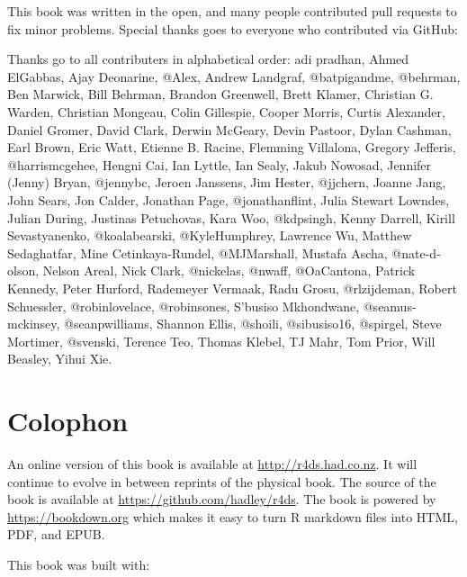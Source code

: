\documentclass[]{book}
\begin{document}
This book was written in the open, and many people contributed pull
requests to fix minor problems. Special thanks goes to everyone who
contributed via GitHub:

Thanks go to all contributers in alphabetical order: adi pradhan, Ahmed
ElGabbas, Ajay Deonarine, @Alex, Andrew Landgraf, @batpigandme,
@behrman, Ben Marwick, Bill Behrman, Brandon Greenwell, Brett Klamer,
Christian G. Warden, Christian Mongeau, Colin Gillespie, Cooper Morris,
Curtis Alexander, Daniel Gromer, David Clark, Derwin McGeary, Devin
Pastoor, Dylan Cashman, Earl Brown, Eric Watt, Etienne B. Racine,
Flemming Villalona, Gregory Jefferis, @harrismcgehee, Hengni Cai, Ian
Lyttle, Ian Sealy, Jakub Nowosad, Jennifer (Jenny) Bryan, @jennybc,
Jeroen Janssens, Jim Hester, @jjchern, Joanne Jang, John Sears, Jon
Calder, Jonathan Page, @jonathanflint, Julia Stewart Lowndes, Julian
During, Justinas Petuchovas, Kara Woo, @kdpsingh, Kenny Darrell, Kirill
Sevastyanenko, @koalabearski, @KyleHumphrey, Lawrence Wu, Matthew
Sedaghatfar, Mine Cetinkaya-Rundel, @MJMarshall, Mustafa Ascha,
@nate-d-olson, Nelson Areal, Nick Clark, @nickelas, @nwaff, @OaCantona,
Patrick Kennedy, Peter Hurford, Rademeyer Vermaak, Radu Grosu,
@rlzijdeman, Robert Schuessler, @robinlovelace, @robinsones, S'busiso
Mkhondwane, @seamus-mckinsey, @seanpwilliams, Shannon Ellis, @shoili,
@sibusiso16, @spirgel, Steve Mortimer, @svenski, Terence Teo, Thomas
Klebel, TJ Mahr, Tom Prior, Will Beasley, Yihui Xie.

\section{Colophon}\label{colophon}

An online version of this book is available at
\url{http://r4ds.had.co.nz}. It will continue to evolve in between
reprints of the physical book. The source of the book is available at
\url{https://github.com/hadley/r4ds}. The book is powered by
\url{https://bookdown.org} which makes it easy to turn R markdown files
into HTML, PDF, and EPUB.

This book was built with:
\end{document}
